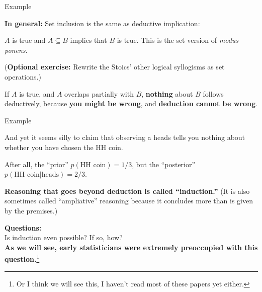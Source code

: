 \documentclass[8pt]{beamer}\usepackage[]{graphicx}\usepackage[]{color}
\begin{document}

\begin{frame}{Example}
    \setminipage{}

\textbf{In general:} Set inclusion is the same as deductive implication:

$A$ is true and $A \subseteq B$ implies that $B$ is true.
This is the set version of {\em modus ponens}.

(\textbf{Optional exercise:} Rewrite the Stoics' other logical syllogisms as set
operations.)

\pause

If $A$ is true, and $A$ overlaps partially with $B$, \textbf{nothing} about $B$
follows deductively, because \textbf{you might be wrong}, and \textbf{deduction
cannot be wrong}.


\end{frame}


\begin{frame}{Example}
    \setminipage{}

And yet it seems silly to claim that observing a heads tells you
nothing about whether you have chosen the HH coin.

After all,  the ``prior'' $p(\textrm{HH coin}) = 1/3$,
but the ``posterior'' $p(\textrm{HH coin} | \textrm{heads}) =
2/3$.

\pause

\textbf{Reasoning that goes beyond deduction is called ``induction.''} (It is
also sometimes called ``ampliative'' reasoning because it concludes more than is
given by the premises.)

\pause
\textbf{Questions:}\\
Is induction even possible?  If so, how?\\
\textbf{As we will see, early statisticians were extremely preoccupied
with this question.}\footnote{Or I think we will see this,
I haven't read most of these papers yet either.}


\end{frame}
\end{document}
